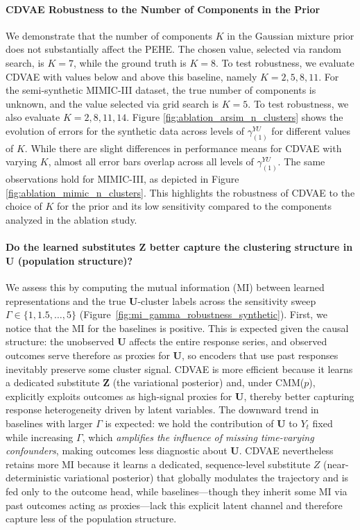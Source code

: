 \documentclass[10pt]{article} %
\begin{document}
\paragraph{CDVAE Robustness to the Number of Components in the Prior}  
We demonstrate that the number of components \(K\) in the Gaussian mixture prior does not substantially affect the PEHE. The chosen value, selected via random search, is \(K=7\), while the ground truth is \(K=8\). To test robustness, we evaluate CDVAE with values below and above this baseline, namely \(K=2, 5, 8, 11\). For the semi-synthetic MIMIC-III dataset, the true number of components is unknown, and the value selected via grid search is \(K=5\). To test robustness, we also evaluate \(K=2, 8, 11, 14\). Figure \ref{fig:ablation_arsim_n_clusters} shows the evolution of errors for the synthetic data across levels of \(\gamma_{(1)}^{YU}\) for different values of \(K\). While there are slight differences in performance means for CDVAE with varying \(K\), almost all error bars overlap across all levels of \(\gamma_{(1)}^{YU}\). The same observations hold for MIMIC-III, as depicted in Figure \ref{fig:ablation_mimic_n_clusters}. This highlights the robustness of CDVAE to the choice of \(K\) for the prior and its low sensitivity compared to the components analyzed in the ablation study.

\paragraph{Do the learned substitutes \(\mathbf{Z}\) better capture the clustering structure in \(\mathbf{U}\) (population structure)?}
We assess this by computing the mutual information (MI) between learned representations and the true \(\mathbf{U}\)-cluster labels across the sensitivity sweep \(\Gamma \in \{1, 1.5, \ldots, 5\}\) (Figure~\ref{fig:mi_gamma_robustness_synthetic}).  First, we notice that the MI for the baselines is positive. This is expected given the causal structure: the unobserved \(\mathbf U\) affects the entire response series, and observed outcomes serve therefore as proxies for \(\mathbf U\), so encoders that use past responses inevitably preserve some cluster signal. CDVAE is more efficient because it learns a dedicated substitute \(\mathbf Z\) (the variational posterior) and, under CMM(\(p\)), explicitly exploits outcomes as high-signal proxies for \(\mathbf U\), thereby better capturing response heterogeneity driven by latent variables. The downward trend in baselines with larger \(\Gamma\) is expected: we hold the contribution of \(\mathbf{U}\) to \(Y_t\) fixed while increasing \(\Gamma\), which \emph{amplifies the influence of missing time-varying confounders}, making outcomes less diagnostic about \(\mathbf{U}\). CDVAE nevertheless retains more MI because it learns a dedicated, sequence-level substitute \(Z\) (near-deterministic variational posterior) that globally modulates the trajectory and is fed only to the outcome head, while baselines—though they inherit some MI via past outcomes acting as proxies—lack this explicit latent channel and therefore capture less of the population structure.
\end{document}
